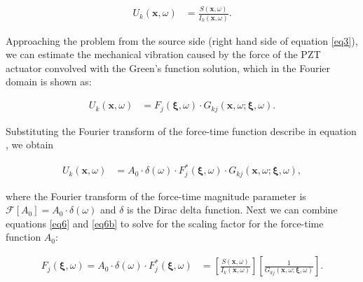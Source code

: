 \documentclass[preprint,3p, 11pt,authoryear]{elsarticle}
\begin{document}
{\begin{equation}
    \label{eq6}
\begin{split}
U_{k}\left( \mathbf{x}, \omega \right) & = 
        \frac{S\left( \mathbf{x}, \omega \right) }{ I_{k}\left( \mathbf{x},\omega \right)}.
\end{split}
\end{equation}

Approaching the problem from the source side (right hand side of equation \eqref{eq3}), we can estimate the mechanical vibration caused by the force of the PZT actuator convolved with the Green's function solution, which in the Fourier domain is shown as:

\begin{equation}
    \label{eq6a}
\begin{split}
U_{k}\left( \mathbf{x}, \omega \right) & = 
       F_{j}\left( \mathbf{\xi}, \omega \right)  \cdot G_{kj}\left(  \mathbf{x}, \omega; \mathbf{\xi}, \omega\right).
\end{split}
\end{equation}

\noindent Substituting the Fourier transform of the force-time function describe in equation , we obtain

\begin{equation}
    \label{eq6b}
\begin{split}
U_{k}\left( \mathbf{x}, \omega \right) & = 
       A_{0}\cdot \delta (\omega)\cdot F^{*}_{j}\left( \mathbf{\xi}, \omega \right)  \cdot G_{kj}\left(  \mathbf{x}, \omega; \mathbf{\xi}, \omega\right),
\end{split}
\end{equation}

\noindent where the Fourier transform of the force-time magnitude parameter is $\mathcal{F}[A_{0}] = A_{0}\cdot\delta(\omega)$ and $\delta$ is the Dirac delta function.  Next we can combine equations \eqref{eq6} and \eqref{eq6b} to solve for the scaling factor for the force-time function $A_{0}$:


\begin{equation}
    \label{eq6c}
\begin{split}
 F_{j}\left( \mathbf{\xi}, \omega \right) = A_{0}\cdot \delta (\omega)  \cdot F^{*}_{j}\left( \mathbf{\xi}, \omega \right) & 
=\left[ \frac{S\left( \mathbf{x}, \omega \right) } 
{ I_{k}\left( \mathbf{x},\omega \right)} \right]
\left[ \frac{1}{ G_{kj}\left(  \mathbf{x}, \omega; \mathbf{\xi}, \omega\right)} \right].
\end{split}
\end{equation}

}
\end{document}
